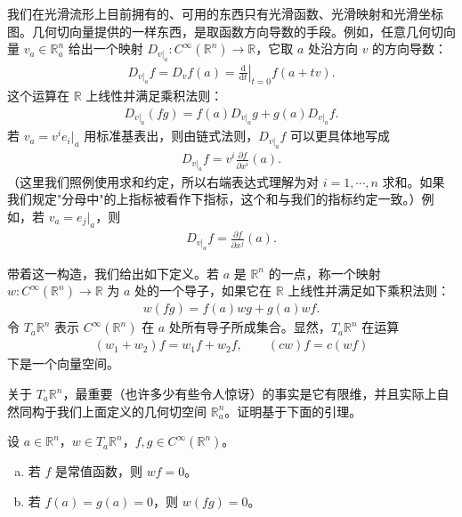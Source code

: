 \documentclass[../../main.tex]{subfiles}
\begin{document}
我们在光滑流形上目前拥有的、可用的东西只有光滑函数、光滑映射和光滑坐标图。几何切向量提供的一样东西，是取函数方向导数的手段。例如，任意几何切向量 $v_{a}\in\mathbb{R}^{n}_{a}$ 给出一个映射 $D_{v|_{a}}:C^{\infty}(\mathbb{R}^{n})\to\mathbb{R}$，它取 $a$ 处沿方向 $v$ 的方向导数：
\begin{align}\label{align:ch03-方向导数}
D_{v|_{a}}f=D_{v}f(a)=\left.\frac{\mathrm{d}}{\mathrm{d}t}\right|_{t=0}f(a+tv).
\end{align}
这个运算在 $\mathbb{R}$ 上线性并满足乘积法则：
\begin{align}\label{align:ch03-方向导数乘积法则}
D_{v|_{a}}(fg)=f(a)D_{v|_{a}}g+g(a)D_{v|_{a}}f.
\end{align}
若 $v_{a}=v^{i}e_{i}|_{a}$ 用标准基表出，则由链式法则，$D_{v|_{a}}f$ 可以更具体地写成
\begin{align*}
D_{v|_{a}}f=v^{i}\frac{\partial f}{\partial x^{i}}(a).
\end{align*}
（这里我们照例使用求和约定，所以右端表达式理解为对 $i=1,\cdots ,n$ 求和。如果我们规定"分母中"的上指标被看作下指标，这个和与我们的指标约定一致。）例如，若 $v_{a}=e_{j}|_{a}$，则
\begin{align*}
D_{v|_{a}}f=\frac{\partial f}{\partial x^{j}}(a).
\end{align*}

带着这一构造，我们给出如下定义。若 $a$ 是 $\mathbb{R}^{n}$ 的一点，称一个映射 $w:C^{\infty}(\mathbb{R}^{n})\to\mathbb{R}$ 为 $a$ 处的一个导子，如果它在 $\mathbb{R}$ 上线性并满足如下乘积法则：
\begin{align}\label{align:ch03-导子乘积法则}
w(fg)=f(a)wg+g(a)wf.
\end{align}
令 $T_{a}\mathbb{R}^{n}$ 表示 $C^{\infty}(\mathbb{R}^{n})$ 在 $a$ 处所有导子所成集合。显然，$T_{a}\mathbb{R}^{n}$ 在运算
\begin{align*}
(w_{1}+w_{2})f=w_{1}f+w_{2}f,\qquad (cw)f=c(wf)
\end{align*}
下是一个向量空间。

关于 $T_{a}\mathbb{R}^{n}$，最重要（也许多少有些令人惊讶）的事实是它有限维，并且实际上自然同构于我们上面定义的几何切空间 $\mathbb{R}^{n}_{a}$。证明基于下面的引理。

\begin{lemma}[导子的性质]\label{lemma:ch03-导子性质}
设 $a\in\mathbb{R}^{n}$，$w\in T_{a}\mathbb{R}^{n}$，$f,g\in C^{\infty}(\mathbb{R}^{n})$。
\begin{enumerate}[(a)]
\item 若 $f$ 是常值函数，则 $wf=0$。
\item 若 $f(a)=g(a)=0$，则 $w(fg)=0$。
\end{enumerate}
\end{lemma}
\end{document}
